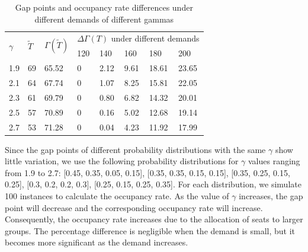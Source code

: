 \begin{table}[ht]
  \centering
  \caption{Gap points and occupancy rate differences under different demands of different gammas}
\begin{tabular}{llllllll}
  \hline
  \multicolumn{1}{|l|}{\multirow{2}{*}{$\gamma$}} & \multicolumn{1}{l|}{\multirow{2}{*}{$\tilde{T}$}} & \multicolumn{1}{l|}{\multirow{2}{*}{$\Gamma(\tilde{T})$}} & \multicolumn{5}{l|}{$\Delta \Gamma(T)$ under different demands}   \\ 
  \cline{4-8} 
  \multicolumn{1}{|l|}{}  & \multicolumn{1}{l|}{} & \multicolumn{1}{l|}{} & \multicolumn{1}{l|}{120} & \multicolumn{1}{l|}{140} & \multicolumn{1}{l|}{160} & \multicolumn{1}{l|}{180} & \multicolumn{1}{l|}{200} \\ 
  \hline
  \multicolumn{1}{|l|}{1.9}  & \multicolumn{1}{l|}{69} & \multicolumn{1}{l|}{65.52}  & \multicolumn{1}{l|}{0}  & \multicolumn{1}{l|}{2.12}  & \multicolumn{1}{l|}{9.61} & \multicolumn{1}{l|}{18.61} & \multicolumn{1}{l|}{23.65} \\
  \hline                                    
  \multicolumn{1}{|l|}{2.1}  & \multicolumn{1}{l|}{64} & \multicolumn{1}{l|}{67.74} & \multicolumn{1}{l|}{0}  & \multicolumn{1}{l|}{1.07}  & \multicolumn{1}{l|}{8.25} & \multicolumn{1}{l|}{15.81} & \multicolumn{1}{l|}{22.05} \\ 
  \hline           
  \multicolumn{1}{|l|}{2.3}  & \multicolumn{1}{l|}{61} & \multicolumn{1}{l|}{69.79}  & \multicolumn{1}{l|}{0}  & \multicolumn{1}{l|}{0.80}  & \multicolumn{1}{l|}{6.82} & \multicolumn{1}{l|}{14.32} & \multicolumn{1}{l|}{20.01} \\ 
  \hline           
  \multicolumn{1}{|l|}{2.5}  & \multicolumn{1}{l|}{57} & \multicolumn{1}{l|}{70.89} & \multicolumn{1}{l|}{0}  & \multicolumn{1}{l|}{0.16}  & \multicolumn{1}{l|}{5.02} & \multicolumn{1}{l|}{12.68} & \multicolumn{1}{l|}{19.14} \\ 
  \hline          
  \multicolumn{1}{|l|}{2.7}  & \multicolumn{1}{l|}{53} & \multicolumn{1}{l|}{71.28}  & \multicolumn{1}{l|}{0}  & \multicolumn{1}{l|}{0.04}  & \multicolumn{1}{l|}{4.23} & \multicolumn{1}{l|}{11.92} & \multicolumn{1}{l|}{17.99} \\ 
  \hline            
\end{tabular}
\end{table}


Since the gap points of different probability distributions with the same $\gamma$ show little variation, we use the following probability distributions for $\gamma$ values ranging from 1.9 to 2.7: [0.45, 0.35, 0.05, 0.15], [0.35, 0.35, 0.15, 0.15], [0.35, 0.25, 0.15, 0.25], [0.3, 0.2, 0.2, 0.3], [0.25, 0.15, 0.25, 0.35]. For each distribution, we simulate 100 instances to calculate the occupancy rate. 
As the value of $\gamma$ increases, the gap point will decrease and the corresponding occupancy rate will increase. Consequently, the occupancy rate increases due to the allocation of seats to larger groups. The percentage difference is negligible when the demand is small, but it becomes more significant as the demand increases.

